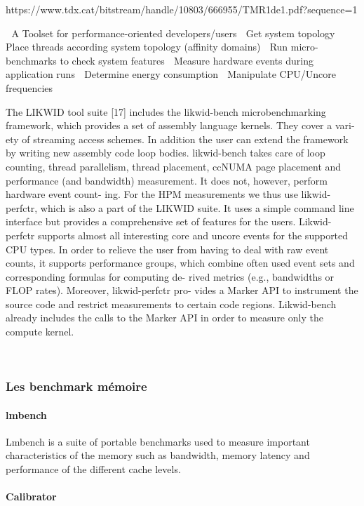 https://www.tdx.cat/bitstream/handle/10803/666955/TMR1de1.pdf?sequence=1

 A Toolset for performance-oriented developers/users
 Get system topology
 Place threads according system topology (affinity domains)
 Run micro-benchmarks to check system features
 Measure hardware events during application runs
 Determine energy consumption
 Manipulate CPU/Uncore frequencies


The LIKWID tool suite [17] includes the likwid-bench microbenchmarking framework, which provides a set of assembly language kernels. They cover a vari- ety of streaming access schemes. In addition the user can extend the framework by writing new assembly code loop bodies. likwid-bench takes care of loop counting, thread parallelism, thread placement, ccNUMA page placement and performance (and bandwidth) measurement. It does not, however, perform hardware event count- ing. For the HPM measurements we thus use likwid-perfctr, which is also a part of the LIKWID suite. It uses a simple command line interface but provides a comprehensive set of features for the users. Likwid-perfctr supports almost all interesting core and uncore events for the supported CPU types. In order to relieve the user from having to deal with raw event counts, it supports performance groups, which combine often used event sets and corresponding formulas for computing de- rived metrics (e.g., bandwidths or FLOP rates). Moreover, likwid-perfctr pro- vides a Marker API to instrument the source code and restrict measurements to certain code regions. Likwid-bench already includes the calls to the Marker API in order to measure only the compute kernel.





~\\

\subsubsection{Les benchmark mémoire}


\paragraph{lmbench \cite{HPC:lmbench}} Lmbench is a suite of portable benchmarks used to measure important characteristics of the memory such as bandwidth, memory latency and performance of the different cache levels.

\paragraph{Calibrator}


